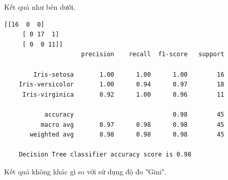 \begin{enumerate}[label=(\alph*)]
    Kết quả như bên dưới.

    \begin{center}
    \begin{lstlisting}[basicstyle=\fontsize{11}{13}\selectfont\ttfamily]
    [[16  0  0]
     [ 0 17  1]
     [ 0  0 11]]
                     precision    recall  f1-score   support

        Iris-setosa       1.00      1.00      1.00        16
    Iris-versicolor       1.00      0.94      0.97        18
     Iris-virginica       0.92      1.00      0.96        11

           accuracy                           0.98        45
          macro avg       0.97      0.98      0.98        45
       weighted avg       0.98      0.98      0.98        45

    Decision Tree classifier accuracy score is 0.98
    \end{lstlisting}
    \end{center}

    Kết quả không khác gì so với sử dụng độ đo "Gini".
\end{enumerate}
